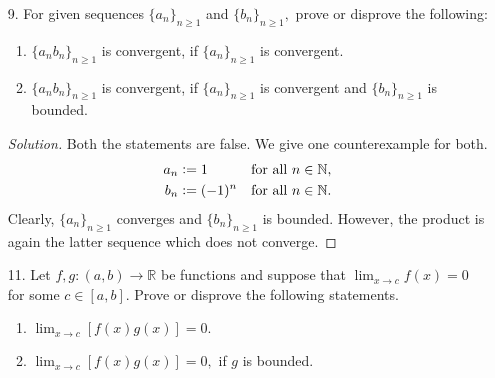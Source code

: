 \documentclass[12pt]{article}
\theoremstyle{definition}
\newenvironment{soln}{\begin{proof}[Solution]}{\end{proof}}
\begin{document}
\begin{itemize}[leftmargin=*]
\begin{soln}
    	By the $\epsilon-N$ definition, there exists $N \in \mathbb{N}$ such that
    	\begin{equation*} 
    		|a_n - L| < \epsilon = \dfrac{|L|}{2}
    	\end{equation*}
    	for all $n > N.$ Using triangle inequality, we get
    	\begin{equation*} 
    		||a_n| - |L|| \le |a_n - L| < \dfrac{|L|}{2}.
    	\end{equation*}
    	Thus, we get
    	\begin{equation*} 
    		-\dfrac{|L|}{2} < |a_n| - |L| < \dfrac{|L|}{2}.
    	\end{equation*}
    	Adding $|L|$ on both sides gives us
    	\begin{equation*} 
    		\dfrac{|L|}{2} < |a_n| < \dfrac{3|L|}{2}
    	\end{equation*}
    	for all $n > N,$ as desired.
    \end{soln}
    \newpage
    \item[9.] For given sequences $\{a_n\}_{n \ge 1}$ and $\{b_n\}_{n \ge 1},$ prove or disprove the following:
    \begin{enumerate}
    	\item $\{a_nb_n\}_{n \ge 1}$ is convergent, if $\{a_n\}_{n \ge 1}$ is convergent.
    	\item $\{a_nb_n\}_{n \ge 1}$ is convergent, if $\{a_n\}_{n \ge 1}$ is convergent and $\{b_n\}_{n \ge 1}$ is bounded.
    \end{enumerate}
    \begin{soln}
    	Both the statements are false. We give one counterexample for both.
    	\begin{align*} 
    		a_n &\vcentcolon= 1 & \text{for all }n \in \mathbb{N},\\
    		b_n &\vcentcolon= (-1)^n & \text{for all }n \in \mathbb{N}.
    	\end{align*}
    	Clearly, $\{a_n\}_{n\ge1}$ converges and $\{b_n\}_{n\ge1}$ is bounded. However, the product is again the latter sequence which does not converge.
    \end{soln}
    \newpage
    \item[11.] Let $f, g:(a, b) \to \mathbb{R}$ be functions and suppose that $\lim_{x\to c}f(x) = 0$ for some $c \in [a, b].$ Prove or disprove the following statements.
    \begin{enumerate}
    	\item $\displaystyle\lim_{x\to c}[f(x)g(x)] = 0.$
    	\item $\displaystyle\lim_{x\to c}[f(x)g(x)] = 0,$ if $g$ is bounded.

\end{enumerate}
\end{itemize}
\end{document}
